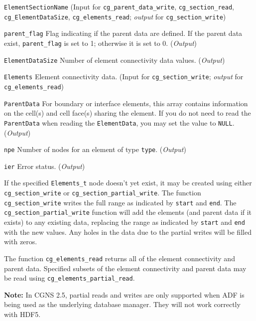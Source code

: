 \begin{Ventryi}{\texttt{ElementSectionName}}
      (\textcolor{input}{Input} for \texttt{cg\_parent\_data\_write},
      \texttt{cg\_section\_read}, \texttt{cg\_ElementDataSize},
      \texttt{cg\_elements\_read};
      \textcolor{output}{\textit{output}} for \texttt{cg\_section\_write})
\item [\texttt{parent\_flag}]
      Flag indicating if the parent data are defined.
      If the parent data exist, \texttt{parent\_flag} is set to 1;
      otherwise it is set to 0.
      (\textcolor{output}{\textit{Output}})
\item [\texttt{ElementDataSize}]
      Number of element connectivity data values.
      (\textcolor{output}{\textit{Output}})
\item [\texttt{Elements}]
      Element connectivity data.
      (\textcolor{input}{Input} for \texttt{cg\_section\_write};
      \textcolor{output}{\textit{output}} for \texttt{cg\_elements\_read})
\item [\texttt{ParentData}]
      For boundary or interface elements, this array contains
      information on the cell(s) and cell face(s) sharing the element.
      If you do not need to read the \texttt{ParentData} when reading
      the \texttt{ElementData}, you may set the value to \texttt{NULL}.
      (\textcolor{output}{\textit{Output}})
\item [\texttt{npe}]
      Number of nodes for an element of type \texttt{type}.
      (\textcolor{output}{\textit{Output}})
\item [\texttt{ier}]
      Error status.
      (\textcolor{output}{\textit{Output}})
\end{Ventryi}

If the specified \texttt{Elements\_t} node doesn't yet exist,
it may be created using either \texttt{cg\_sec\-tion\_write} or
\texttt{cg\_section\_partial\_write}.
The function \texttt{cg\_section\_write} writes the full range as
indicated by \texttt{start} and \texttt{end}.
The \texttt{cg\_section\_partial\_write} function will add the elements
(and parent data if it exists) to any existing data, replacing the range
as indicated by \texttt{start} and \texttt{end} with the new values.
Any holes in the data due to the partial writes will be filled with
zeros.

The function \texttt{cg\_elements\_read} returns all of the element
connectivity and parent data.
Specified subsets of the element connectivity and parent data may be
read using \texttt{cg\_elements\_partial\_read}.

\noindent
\textbf{Note:} In CGNS 2.5, partial reads and writes are only supported
when ADF is being used as the underlying database manager.
They will not work correctly with HDF5.

